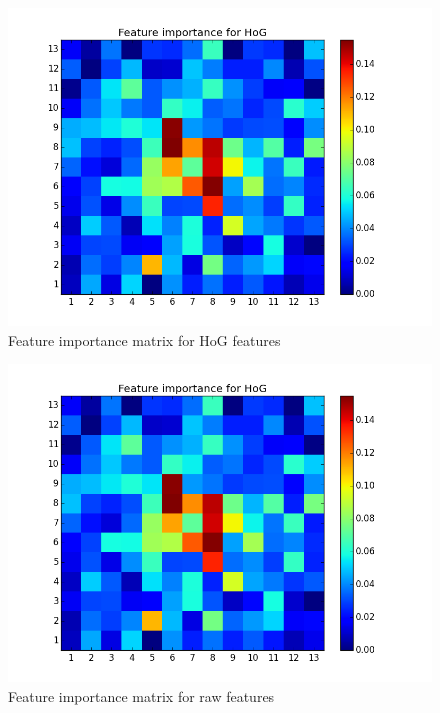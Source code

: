 \documentclass[10pt]{article}
\begin{document}
\begin{figure}
\begin{center}
\includegraphics[scale=0.4]{images/HoG_DT_Heatmap.png}
\caption{Feature importance matrix for HoG features}
\label{fig:hogdtheat}
\end{center}
\end{figure}

\begin{figure}
\begin{center}
\includegraphics[scale=0.4]{images/HoG_DT_Heatmap.png}
\caption{Feature importance matrix for raw features}
\label{fig:rawdtheat}
\end{center}
\end{figure}
\end{document}
